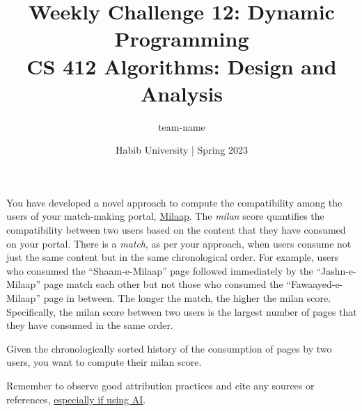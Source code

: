 \documentclass[a4paper]{exam}
\title{Weekly Challenge 12: Dynamic Programming\\CS 412 Algorithms: Design and Analysis}
\author{team-name}  %
\date{Habib University | Spring 2023}
\begin{document}
\maketitle

\begin{questions}

  

  You have developed a novel approach to compute the compatibility among the users of your match-making portal, \href{https://habib.edu.pk}{Milaap}. The \textit{milan} score quantifies the compatibility between two users based on the content that they have consumed on your portal. There is a \textit{match}, as per your approach, when users consume not just the same content but in the same chronological order. For example, users who consumed the ``Shaam-e-Milaap'' page followed immediately by the ``Jashn-e-Milaap'' page match each other but not those who consumed the ``Fawaayed-e-Milaap'' page in between. The longer the match, the higher the milan score. Specifically, the milan score between two users is the largest number of pages that they have consumed in the same order.

  Given the chronologically sorted history of the consumption of pages by two users, you want to compute their milan score.
  Remember to observe good attribution practices and cite any sources or references, \href{https://hulms.instructure.com/courses/2616/discussion_topics/29240}{especially if using AI}.

  \begin{solution}
  \end{solution}
  
\end{questions}
\end{document}
